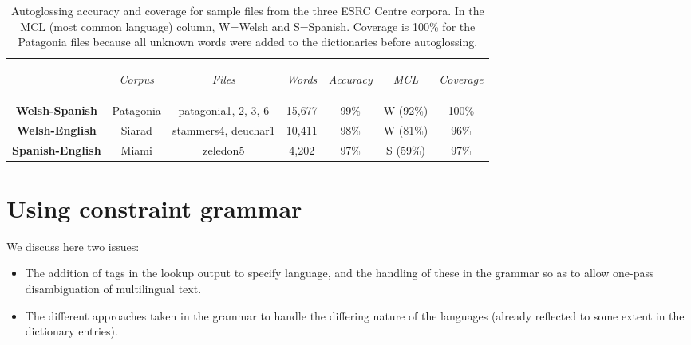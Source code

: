 \documentclass[11pt]{article}
\begin{document}
\begin{table*}[!hbtp]
\centering
\begin{tabular}{ccccccc}
& \begin{small}\textit{Corpus}\end{small} & \begin{small}\textit{Files}\end{small} & \begin{small}\textit{Words}\end{small} & \begin{small}\textit{Accuracy}\end{small} & \begin{small}\textit{MCL}\end{small} & \begin{small}\textit{Coverage}\end{small} \\
\cline{2-7}\noalign{\smallskip}
\textbf{Welsh-Spanish} & Patagonia & patagonia1, 2, 3, 6 & 15,677 & 99\% & W (92\%) & 100\% \\
\textbf{Welsh-English} & Siarad & stammers4, deuchar1 & 10,411 & 98\% & W (81\%) & 96\% \\
\textbf{Spanish-English} & Miami & zeledon5 & 4,202 & 97\% & S (59\%) & 97\% \\
\end{tabular}
\caption[center]{Autoglossing accuracy and coverage for sample files from the three ESRC Centre corpora.  In the MCL (most common language) column, W=Welsh and S=Spanish.  Coverage is 100\% for the Patagonia files because all unknown words were added to the dictionaries before autoglossing.}
\label{accuracy}
\end{table*}


\section{Using constraint grammar}
\label{sec:constraint}

We discuss here two issues:
\begin{itemize}
\item The addition of tags in the lookup output to specify language, and the handling of these in the grammar so as to allow one-pass disambiguation of multilingual text.
\item The different approaches taken in the grammar to handle the differing nature of the languages (already reflected to some extent in the dictionary entries).
\end{itemize}
\end{document}
